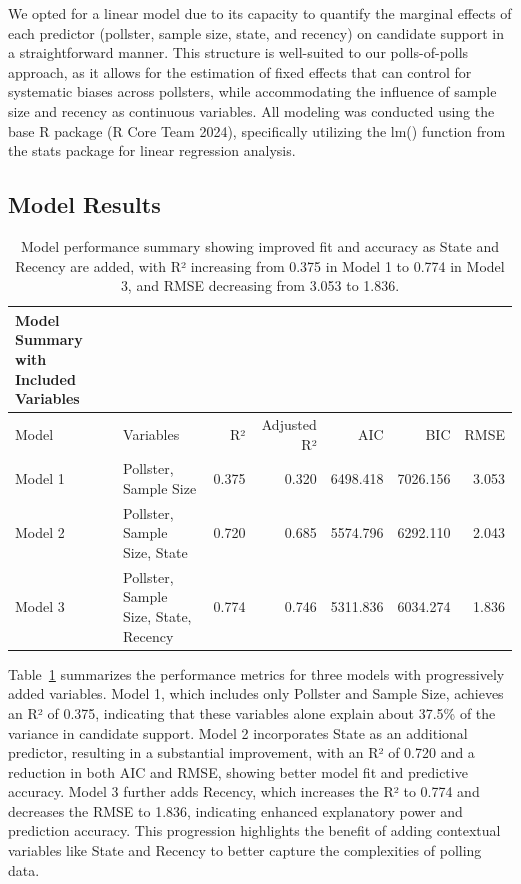 \documentclass[
  letterpaper,
  DIV=11,
  numbers=noendperiod]{scrartcl}
\begin{document}
We opted for a linear model due to its capacity to quantify the marginal
effects of each predictor (pollster, sample size, state, and recency) on
candidate support in a straightforward manner. This structure is
well-suited to our polls-of-polls approach, as it allows for the
estimation of fixed effects that can control for systematic biases
across pollsters, while accommodating the influence of sample size and
recency as continuous variables. All modeling was conducted using the
base R package (R Core Team 2024), specifically utilizing the lm()
function from the stats package for linear regression analysis.

\hypertarget{model-results}{%
\subsection{Model Results}\label{model-results}}

\hypertarget{tbl-summary}{}
\begin{longtable}[t]{llrrrrr}
\caption{\label{tbl-summary}Model performance summary showing improved fit and accuracy as State and
Recency are added, with R² increasing from 0.375 in Model 1 to 0.774 in
Model 3, and RMSE decreasing from 3.053 to 1.836. }Model Summary with Included Variables}\\
\toprule
Model & Variables & R² & Adjusted R² & AIC & BIC & RMSE\\
\midrule
Model 1 & Pollster, Sample Size & 0.375 & 0.320 & 6498.418 & 7026.156 & 3.053\\
Model 2 & Pollster, Sample Size, State & 0.720 & 0.685 & 5574.796 & 6292.110 & 2.043\\
Model 3 & Pollster, Sample Size, State, Recency & 0.774 & 0.746 & 5311.836 & 6034.274 & 1.836\\
\bottomrule
\end{longtable}

Table~\ref{tbl-summary} summarizes the performance metrics for three
models with progressively added variables. Model 1, which includes only
Pollster and Sample Size, achieves an R² of 0.375, indicating that these
variables alone explain about 37.5\% of the variance in candidate
support. Model 2 incorporates State as an additional predictor,
resulting in a substantial improvement, with an R² of 0.720 and a
reduction in both AIC and RMSE, showing better model fit and predictive
accuracy. Model 3 further adds Recency, which increases the R² to 0.774
and decreases the RMSE to 1.836, indicating enhanced explanatory power
and prediction accuracy. This progression highlights the benefit of
adding contextual variables like State and Recency to better capture the
complexities of polling data.
\end{document}
